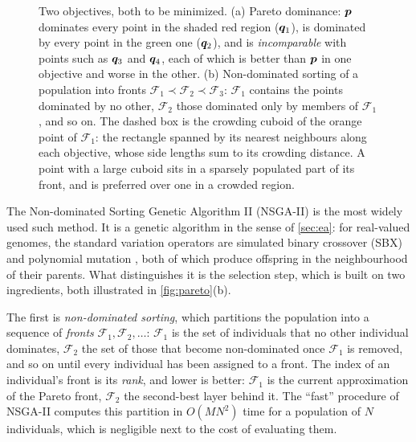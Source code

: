 \begin{figure}[htbp]
\caption[Pareto dominance, non-dominated fronts and crowding distance]{Two objectives, both to be minimized. (a) Pareto dominance: $\bm{p}$ dominates every point in the shaded red region ($\bm{q}_1$), is dominated by every point in the green one ($\bm{q}_2$), and is \emph{incomparable} with points such as $\bm{q}_3$ and $\bm{q}_4$, each of which is better than $\bm{p}$ in one objective and worse in the other. (b) Non-dominated sorting of a population into fronts $\mathcal{F}_1 \prec \mathcal{F}_2 \prec \mathcal{F}_3$: $\mathcal{F}_1$ contains the points dominated by no other, $\mathcal{F}_2$ those dominated only by members of $\mathcal{F}_1$, and so on. The dashed box is the crowding cuboid of the orange point of $\mathcal{F}_1$: the rectangle spanned by its nearest neighbours along each objective, whose side lengths sum to its crowding distance. A point with a large cuboid sits in a sparsely populated part of its front, and is preferred over one in a crowded region.}
\label{fig:pareto}
\end{figure}

The Non-dominated Sorting Genetic Algorithm II (NSGA-II) \cite{deb2002nsga2} is the most widely used such method. It is a genetic algorithm in the sense of \autoref{sec:ea}: for real-valued genomes, the standard variation operators are simulated binary crossover (SBX) and polynomial mutation \cite{deb1995sbx}, both of which produce offspring in the neighbourhood of their parents. What distinguishes it is the selection step, which is built on two ingredients, both illustrated in \autoref{fig:pareto}(b).

The first is \emph{non-dominated sorting}, which partitions the population into a sequence of \emph{fronts} $\mathcal{F}_1, \mathcal{F}_2, \dots$: $\mathcal{F}_1$ is the set of individuals that no other individual dominates, $\mathcal{F}_2$ the set of those that become non-dominated once $\mathcal{F}_1$ is removed, and so on until every individual has been assigned to a front. The index of an individual's front is its \emph{rank}, and lower is better: $\mathcal{F}_1$ is the current approximation of the Pareto front, $\mathcal{F}_2$ the second-best layer behind it. The ``fast'' procedure of NSGA-II computes this partition in $O(M N^2)$ time for a population of $N$ individuals, which is negligible next to the cost of evaluating them.

